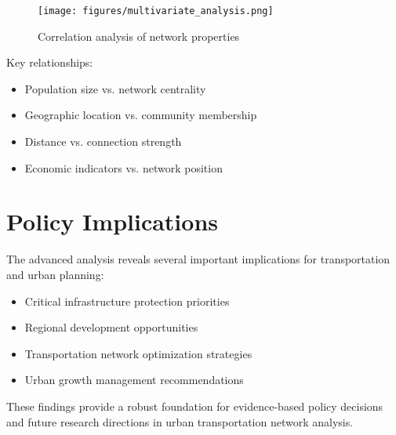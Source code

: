 \begin{figure}[H]
    \centering
    \texttt{[image: figures/multivariate\_analysis.png]}
    \caption{Correlation analysis of network properties}
    \label{fig:multivariate}
\end{figure}

Key relationships:
\begin{itemize}
    \item Population size vs. network centrality
    \item Geographic location vs. community membership
    \item Distance vs. connection strength
    \item Economic indicators vs. network position
\end{itemize}

\section{Policy Implications}
The advanced analysis reveals several important implications for transportation and urban planning:

\begin{itemize}
    \item Critical infrastructure protection priorities
    \item Regional development opportunities
    \item Transportation network optimization strategies
    \item Urban growth management recommendations
\end{itemize}

These findings provide a robust foundation for evidence-based policy decisions and future research directions in urban transportation network analysis. 